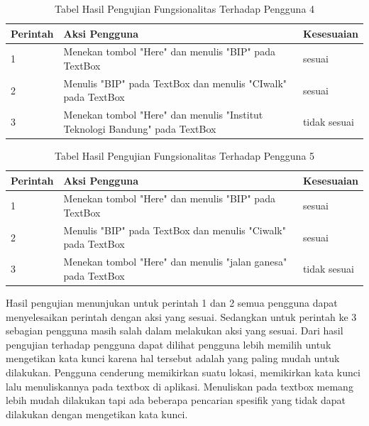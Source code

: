 \begin{table}[h!]
	\centering
		\begin{tabular}{|p{}|p{9cm}|p{2cm}|}\hline
				Perintah & Aksi Pengguna & Kesesuaian \\ \hline
				1 & Menekan tombol "Here" dan menulis "BIP" pada TextBox & sesuai \\ \hline
				2 & Menulis "BIP" pada TextBox dan menulis "CIwalk" pada TextBox & sesuai \\ \hline
				3 & Menekan tombol "Here" dan menulis "Institut Teknologi Bandung" pada TextBox & tidak sesuai \\ \hline
		\end{tabular}
	\caption{Tabel Hasil Pengujian Fungsionalitas Terhadap Pengguna 4}
	\label{tab:TabelHasilPengujianFungsionalitasTerhadapPengguna}
\end{table}

\begin{table}[h!]
	\centering
		\begin{tabular}{|p{}|p{9cm}|p{2cm}|}\hline
				Perintah & Aksi Pengguna & Kesesuaian \\ \hline
				1 & Menekan tombol "Here" dan menulis "BIP" pada TextBox & sesuai \\ \hline
				2 & Menulis "BIP" pada TextBox dan menulis "Ciwalk" pada TextBox & sesuai \\ \hline
				3 & Menekan tombol "Here" dan menulis "jalan ganesa" pada TextBox & tidak sesuai \\ \hline
		\end{tabular}
	\caption{Tabel Hasil Pengujian Fungsionalitas Terhadap Pengguna 5}
	\label{tab:TabelHasilPengujianFungsionalitasTerhadapPengguna}
\end{table}

\hspace{0.5cm} Hasil pengujian menunjukan untuk perintah 1 dan 2 semua pengguna dapat menyelesaikan perintah dengan aksi yang sesuai. Sedangkan untuk perintah ke 3 sebagian pengguna masih salah dalam melakukan aksi yang sesuai. Dari hasil pengujian terhadap pengguna dapat dilihat pengguna lebih memilih untuk mengetikan kata kunci karena hal tersebut adalah yang paling mudah untuk dilakukan. Pengguna cenderung memikirkan suatu lokasi, memikirkan kata kunci lalu menuliskannya pada textbox di aplikasi. Menuliskan pada textbox memang lebih mudah dilakukan tapi ada beberapa pencarian spesifik yang tidak dapat dilakukan dengan mengetikan kata kunci.   

